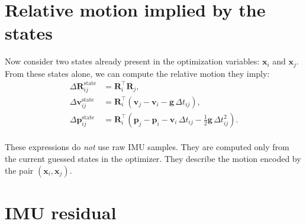 \documentclass[11pt]{article}
\newcommand{\T}{^{\top}}
\begin{document}
\section{Relative motion implied by the states}

Now consider two states already present in the optimization variables:
\(\mathbf{x}_i\) and \(\mathbf{x}_j\).
From these states alone, we can compute the relative motion they imply:
\begin{align}
\Delta \mathbf{R}^{\mathrm{state}}_{ij} &= \mathbf{R}_i\T \mathbf{R}_j, \\
\Delta \mathbf{v}^{\mathrm{state}}_{ij} &= \mathbf{R}_i\T\left(\mathbf{v}_j - \mathbf{v}_i - \mathbf{g}\,\Delta t_{ij}\right), \\
\Delta \mathbf{p}^{\mathrm{state}}_{ij} &= \mathbf{R}_i\T\left(\mathbf{p}_j - \mathbf{p}_i - \mathbf{v}_i\,\Delta t_{ij} - \tfrac{1}{2}\mathbf{g}\,\Delta t_{ij}^2\right).
\end{align}
\\
These expressions do \emph{not} use raw IMU samples. They are computed only from the current guessed states in the optimizer. They describe the motion encoded by the pair \((\mathbf{x}_i,\mathbf{x}_j)\).

\section{IMU residual}
\end{document}

